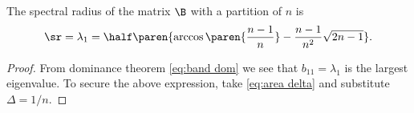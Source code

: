 \begin{theorem}
The spectral radius of the matrix $\B$ with a partition of $n$ is
  \begin{equation}
    \sr = \lambda_{1} = \half \paren{ \arccos \paren{\frac{n-1} {n}} - \frac{n-1}{n^{2}} \sqrt{2n - 1}}.
    \label{eq:sr}
  \end{equation}
\label{thm:spectral radius}
\end{theorem}
\begin{proof}
From dominance theorem \eqref{eq:band dom} we see that $b_{11} = \lambda_{1}$ is the largest eigenvalue. To secure the above expression, take \eqref{eq:area delta} and substitute $\Delta = 1/n$.
\end{proof}

\endinput %